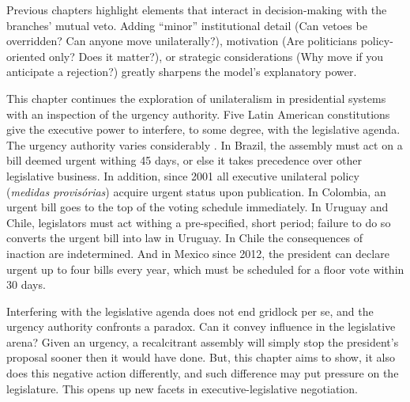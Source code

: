 \documentclass[letter,12pt]{article}
\begin{document}
Previous chapters highlight elements that interact in decision-making with the branches' mutual veto. Adding ``minor'' institutional detail (Can vetoes be overridden? Can anyone move unilaterally?), motivation (Are politicians policy-oriented only? Does it matter?), or strategic considerations (Why move if you anticipate a rejection?) greatly sharpens the model's explanatory power. 


This chapter continues the exploration of unilateralism in presidential systems with an inspection of the urgency authority. Five Latin American constitutions give the executive power to interfere, to some degree, with the legislative agenda. The urgency authority varies considerably \citep[][:437]{morgenstern.2002b}. In Brazil, the assembly must act on a bill deemed urgent withing 45 days, or else it takes precedence over other legislative business. In addition, since 2001 all executive unilateral policy (\emph{medidas provis\'orias}) acquire urgent status upon publication. In Colombia, an urgent bill goes to the top of the voting schedule immediately. In Uruguay and Chile, legislators must act withing a pre-specified, short period; failure to do so converts the urgent bill into law in Uruguay. In Chile the consequences of inaction are indetermined. And in Mexico since 2012, the president can declare urgent up to four bills every year, which must be scheduled for a floor vote within 30 days. 

Interfering with the legislative agenda does not end gridlock per se, and the urgency authority confronts a paradox. Can it convey influence in the legislative arena? Given an urgency, a recalcitrant assembly will simply stop the president's proposal sooner then it would have done. But, this chapter aims to show, it also does this negative action differently, and such difference may put pressure on the legislature. This opens up new facets in executive-legislative negotiation. 
\end{document}
